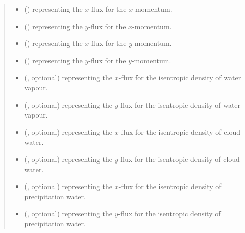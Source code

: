 \documentclass[letterpaper,10pt,english]{sphinxmanual}
\begin{document}
\begin{fulllineitems}
\begin{fulllineitems}
\begin{quote}
\begin{description}
\begin{itemize}
\item {} 
 () \textendash{}  representing the \(x\)-flux for the \(x\)-momentum.

\item {} 
 () \textendash{}  representing the \(y\)-flux for the \(x\)-momentum.

\item {} 
 () \textendash{}  representing the \(x\)-flux for the \(y\)-momentum.

\item {} 
 () \textendash{}  representing the \(y\)-flux for the \(y\)-momentum.

\item {} 
 (, optional) \textendash{}  representing the \(x\)-flux for the isentropic density of water vapour.

\item {} 
 (, optional) \textendash{}  representing the \(y\)-flux for the isentropic density of water vapour.

\item {} 
 (, optional) \textendash{}  representing the \(x\)-flux for the isentropic density of cloud water.

\item {} 
 (, optional) \textendash{}  representing the \(y\)-flux for the isentropic density of cloud water.

\item {} 
 (, optional) \textendash{}  representing the \(x\)-flux for the isentropic density of precipitation water.

\item {} 
 (, optional) \textendash{}  representing the \(y\)-flux for the isentropic density of precipitation water.


\end{itemize}
\end{description}
\end{quote}
\end{fulllineitems}
\end{fulllineitems}
\end{document}
